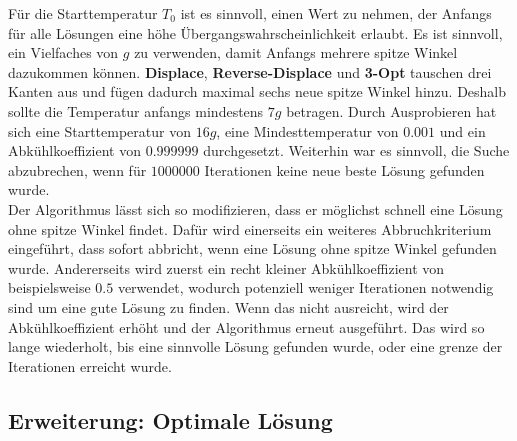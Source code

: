 \documentclass[a4paper,10pt,ngerman]{scrartcl}
\begin{document}
Für die Starttemperatur $T_0$ ist es sinnvoll, einen Wert zu nehmen, der Anfangs für alle Lösungen eine höhe Übergangswahrscheinlichkeit
erlaubt. Es ist sinnvoll, ein Vielfaches von $g$ zu verwenden, damit Anfangs mehrere spitze Winkel dazukommen können. \textbf{Displace}, \textbf{Reverse-Displace} und
\textbf{3-Opt} tauschen drei Kanten aus und fügen dadurch maximal sechs neue spitze Winkel hinzu. Deshalb sollte die Temperatur anfangs mindestens $7g$ betragen. Durch
Ausprobieren hat sich eine Starttemperatur von $16g$, eine Mindesttemperatur von $0.001$ und ein Abkühlkoeffizient von $0.999999$ durchgesetzt. Weiterhin war es sinnvoll, die Suche abzubrechen, wenn für
$1000000$ Iterationen keine neue beste Lösung gefunden wurde. \\
Der Algorithmus lässt sich so modifizieren, dass er möglichst schnell eine Lösung ohne spitze Winkel findet. Dafür wird einerseits ein weiteres Abbruchkriterium
eingeführt, dass sofort abbricht, wenn eine Lösung ohne spitze Winkel gefunden wurde. Andererseits wird zuerst ein recht kleiner Abkühlkoeffizient von beispielsweise
$0.5$ verwendet, wodurch potenziell weniger Iterationen notwendig sind um eine gute Lösung zu finden. Wenn das nicht ausreicht, wird der Abkühlkoeffizient erhöht und der Algorithmus
erneut ausgeführt. Das wird so lange wiederholt, bis eine sinnvolle Lösung gefunden wurde, oder eine grenze der Iterationen erreicht wurde.
\subsection{Erweiterung: Optimale Lösung}
\end{document}
